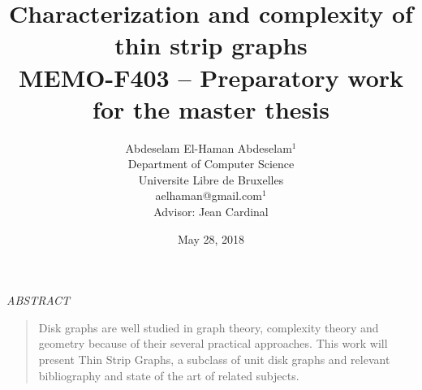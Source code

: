 \documentclass[12pt]{article}
\title{Characterization and complexity of thin strip graphs\\
\small MEMO-F403 -- Preparatory work for the master thesis}
\author{Abdeselam El-Haman Abdeselam$^1$  \\  Department of Computer
Science \\ Universite Libre de Bruxelles\\ {\small aelhaman@gmail.com$^1$}\\[0.5cm]{\small Advisor:
Jean Cardinal}}
\date{May 28, 2018}
\begin{document}
  \maketitle




\begin{center} {\sl ABSTRACT} \end{center}

\begin{quotation}

Disk graphs are well studied in graph theory, complexity theory and geometry
because of their several practical approaches.
This work will present Thin Strip Graphs, a subclass of unit disk graphs and
relevant bibliography and state of the art of related subjects.

\end{quotation}








\end{document}
